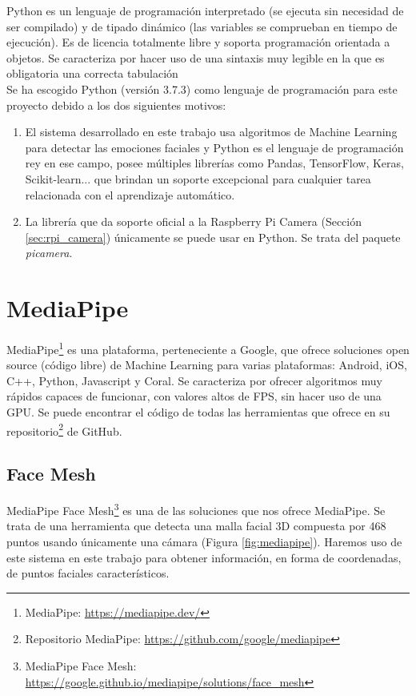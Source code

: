 Python es un lenguaje de programación interpretado (se ejecuta sin necesidad de ser compilado) y de tipado dinámico (las variables se comprueban en tiempo de ejecución). Es de licencia totalmente libre y soporta programación orientada a objetos. Se caracteriza por hacer uso de una sintaxis muy legible en la que es obligatoria una correcta tabulación\\

Se ha escogido Python (versión 3.7.3) como lenguaje de programación para este proyecto debido a los dos siguientes motivos:

\begin{enumerate}
    \item El sistema desarrollado en este trabajo usa algoritmos de Machine Learning para detectar las emociones faciales y Python es el lenguaje de programación rey en ese campo, posee múltiples librerías como Pandas, TensorFlow, Keras, Scikit-learn... que brindan un soporte excepcional para cualquier tarea relacionada con el aprendizaje automático.
    
    \item La librería que da soporte oficial a la Raspberry Pi Camera (Sección \ref{sec:rpi_camera}) únicamente se puede usar en Python. Se trata del paquete \textit{picamera}.
\end{enumerate}

\section{MediaPipe}

MediaPipe\footnote{MediaPipe: \url{https://mediapipe.dev/}} es una plataforma, perteneciente a Google, que ofrece soluciones open source (código libre) de Machine Learning para varias plataformas: Android, iOS, C++, Python, Javascript y Coral. Se caracteriza por ofrecer algoritmos muy rápidos capaces de funcionar, con valores altos de FPS, sin hacer uso de una GPU. Se puede encontrar el código de todas las herramientas que ofrece en su repositorio\footnote{Repositorio MediaPipe: \url{https://github.com/google/mediapipe}} de GitHub.

\subsection{Face Mesh}

MediaPipe Face Mesh\footnote{MediaPipe Face Mesh: \url{https://google.github.io/mediapipe/solutions/face_mesh}} es una de las soluciones que nos ofrece MediaPipe. Se trata de una herramienta que detecta una malla facial 3D compuesta por 468 puntos usando únicamente una cámara (Figura \ref{fig:mediapipe}). Haremos uso de este sistema en este trabajo para obtener información, en forma de coordenadas, de puntos faciales característicos.\\

